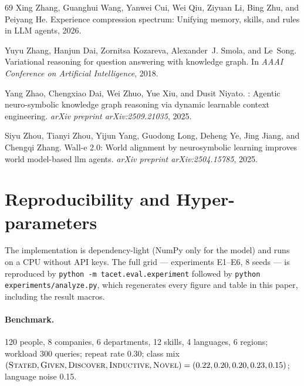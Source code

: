 \documentclass[11pt]{article}
\theoremstyle{plain}
\newcommand{\seeds}{8}
\begin{document}
{\begin{thebibliography}{69}
Xing Zhang, Guanghui Wang, Yanwei Cui, Wei Qiu, Ziyuan Li, Bing Zhu, and
  Peiyang He.
\newblock Experience compression spectrum: Unifying memory, skills, and rules
  in {LLM} agents, 2026.

Yuyu Zhang, Hanjun Dai, Zornitsa Kozareva, Alexander~J. Smola, and Le~Song.
\newblock Variational reasoning for question answering with knowledge graph.
\newblock In \emph{AAAI Conference on Artificial Intelligence}, 2018.

Yang Zhao, Chengxiao Dai, Wei Zhuo, Yue Xiu, and Dusit Niyato.
: Agentic neuro-symbolic knowledge graph reasoning via
  dynamic learnable context engineering.
\newblock \emph{arXiv preprint arXiv:2509.21035}, 2025.

Siyu Zhou, Tianyi Zhou, Yijun Yang, Guodong Long, Deheng Ye, Jing Jiang, and
  Chengqi Zhang.
\newblock Wall-e 2.0: World alignment by neurosymbolic learning improves world
  model-based llm agents.
\newblock \emph{arXiv preprint arXiv:2504.15785}, 2025.

\end{thebibliography}
}

\appendix
\section{Reproducibility and Hyper-parameters}

The implementation is dependency-light (NumPy only for the model) and runs
on a CPU without API keys. The full grid --- experiments E1--E6, \seeds{}
seeds --- is reproduced by
\texttt{python -m tacet.eval.experiment} followed by
\texttt{python experiments/analyze.py}, which regenerates every figure and
table in this paper, including the result macros.

\paragraph{Benchmark.} 120 people, 8 companies, 6 departments, 12 skills,
4 languages, 6 regions; workload 300 queries; repeat rate 0.30; class mix
$(\textsc{Stated},\textsc{Given},\textsc{Discover},\textsc{Inductive},
\textsc{Novel})=(0.22,0.20,0.20,0.23,0.15)$; language noise 0.15.
\end{document}
